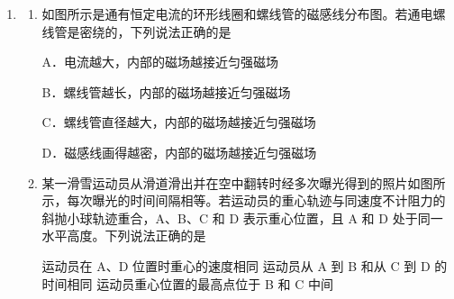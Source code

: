 \documentclass[\gkver]{gaokaozhenti}
\begin{document}
\begin{enumerate}
\fourchoices[answer=C]
{$16 \Ums$}
{$1.1 \times 10^{2} \Ums$}
{$1.6 \times 10^{3} \Ums$}
{$1.4 \times 10^{4} \Ums$}


\item
\begin{enumerate}
	\item
	如图所示是通有恒定电流的环形线圈和螺线管的磁感线分布图。若通电螺线管是密绕的，下列说法正确的是 


	A．电流越大，内部的磁场越接近匀强磁场

	B．螺线管越长，内部的磁场越接近匀强磁场

	C．螺线管直径越大，内部的磁场越接近匀强磁场

	D．磁感线画得越密，内部的磁场越接近匀强磁场
	\item
	某一滑雪运动员从滑道滑出并在空中翻转时经多次曝光得到的照片如图所示，每次曝光的时间间隔相等。若运动员的重心轨迹与同速度不计阻力的斜抛小球轨迹重合，A、B、C 和 D 表示重心位置，且 A 和 D 处于同一水平高度。下列说法正确的是 


	{运动员在 A、D 位置时重心的速度相同}
	{运动员从 A 到 B 和从 C 到 D 的时间相同}
	{运动员重心位置的最高点位于 B 和 C 中间}
\end{enumerate}

\end{enumerate}
\end{document}
